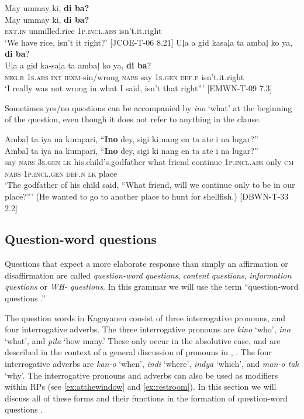 \ea
May  ummay  ki,  \textbf{di ba?} \\\smallskip
\gll May  ummay  ki,  \textbf{di ba?} \\
\textsc{ext.in}  unmilled.rice  1\textsc{p.incl.abs}  isn’t.it.right \\
\glt ‘We have rice, isn’t it right?’ [JCOE-T-06 8.21]
\z
\ea
Uļa  a  gid  kasaļa  ta  ambaļ  ko  ya,  \textbf{di ba}? \\\smallskip
\gll Uļa  a  gid  ka-saļa  ta  ambaļ  ko  ya,  \textbf{di ba}? \\
\textsc{neg.r}  1\textsc{s.abs}  \textsc{int}  \textsc{iexm}-sin/wrong  \textsc{nabs}  say  1\textsc{s.gen}  \textsc{def.f}  isn’t.it.right \\
\glt ‘I really was not wrong in what I said, isn’t that right”' [EMWN-T-09 7.3]
\z

Sometimes yes/no questions can be accompanied by \textit{ino} ‘what’ at the beginning of the question, even though it does not refer to anything in the clause.

\ea
Ambaļ  ta  iya  na  kumpari,  “\textbf{Ino}  dey,  sigi  ki  nang en  ta  ate  i  na  lugar?” \\\smallskip
\gll Ambaļ  ta  iya  na  kumpari,  “\textbf{Ino}  dey,  sigi  ki  nang en  ta  ate  i  na  lugar?” \\
say  \textsc{nabs}  3\textsc{s.gen}  \textsc{lk}  his.child’s.godfather  what  friend  continue  1\textsc{p.incl.abs}  only
\textsc{cm}  \textsc{nabs}  1\textsc{p.incl.gen}  \textsc{def.n}  \textsc{lk}  place \\
\glt `The godfather of his child said, “What friend, will we continue only to be in our place?”’ (He wanted to go to  another place to hunt for shellfish.) [DBWN-T-33 2.2]
\z
\subsection{Question-word questions }
\label{bkm:Ref445900292} \label{sec:questionwordquestions}

Questions that expect a more elaborate response than simply an affirmation or disaffirmation are called \textit{question-word} \textit{questions}, \textit{content} \textit{questions}, \textit{information} \textit{questions} or \textit{WH- questions}. In this grammar we will use the term “question-word questions .”

The question words in Kagayanen consist of three interrogative pronouns, and four interrogative adverbs. The three interrogative pronouns are \textit{kino} ‘who’, \textit{ino} ‘what’, and \textit{pila} ‘how many.’ These only occur in the absolutive case, and are described in the context of a general discussion of pronouns in , . The four interrogative adverbs are \textit{kan-o} ‘when’, \textit{indi} ‘where’, \textit{indya} ‘which’, and \textit{man-o tak} ‘why’. The interrogative pronouns and adverbs can also be used as modifiers within RPs (see \ref{ex:atthewindow} and \ref{ex:restroom}). In this section we will discuss all of these forms and their functions in the formation of question-word questions .


